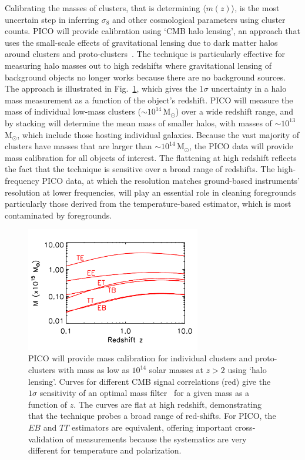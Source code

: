 \documentclass[PICOReport.tex]{subfiles}
\begin{document}
Calibrating the masses of clusters, that is determining $\langle m(z) \rangle$, is the most uncertain step in inferring $\sigma_{8}$ and other cosmological parameters using cluster counts.  PICO will provide calibration using `CMB halo lensing', an approach that uses the small-scale effects of gravitational lensing due to dark matter halos around clusters and proto-clusters~\citep{2015ApJ...806..247B, 2015PhRvL.114o1302M, 2016A&A...594A..24P}. The technique is particularly effective for measuring halo masses out to high redshifts where gravitational lensing of background objects no longer works because there are no background sources. 
The approach is illustrated in Fig.~\ref{fig:HaloLensing}, which gives the $1\sigma$ uncertainty in a halo mass measurement as a function of the object's redshift. PICO will measure the mass of individual low-mass clusters ($\sim 10^{14}$\,M$_\odot$) over a wide redshift range, and by stacking will determine the mean mass of smaller halos, with masses of $\sim 10^{13}$\,M$_\odot$, which include those hosting individual galaxies. Because the vast majority of clusters have masses that are larger than $\sim 10^{14}$\,M$_\odot$, the PICO data will provide mass calibration for all objects of interest. The flattening at high redshift reflects the fact that the technique is sensitive over a broad range of redshifts. The high-frequency PICO data, at which the resolution matches ground-based instruments' resolution at lower frequencies, will play an essential role in cleaning foregrounds particularly those derived from the temperature-based estimator, which is most contaminated by foregrounds. 
\begin{figure}[h]
\hspace{-0.1in}
\parbox{3.1in}{\centerline {
\includegraphics[width=3.0in]{images/m500lim_vs_z_pico_polar_v4.pdf} } }
\hspace{0.in}
\parbox{3.4in}{
\caption{\captiontext 
PICO will provide mass calibration for individual clusters and proto-clusters with mass as low as $10^{14}$ solar masses at $z>2$ using `halo lensing'. Curves for different CMB signal correlations (red) give the $1\sigma$ sensitivity of an optimal mass filter~\citep{2015A&A...578A..21M} for a given mass as a function of $z$.  The curves are flat at high redshift, demonstrating that the technique probes a broad range of red-shifts. For PICO, the $EB$ and $TT$ estimators are equivalent, offering important cross-validation of measurements because the systematics are very different for temperature and polarization. 
\label{fig:HaloLensing} 
} }
\vspace{-0.2in}
\end{figure}
\end{document}
